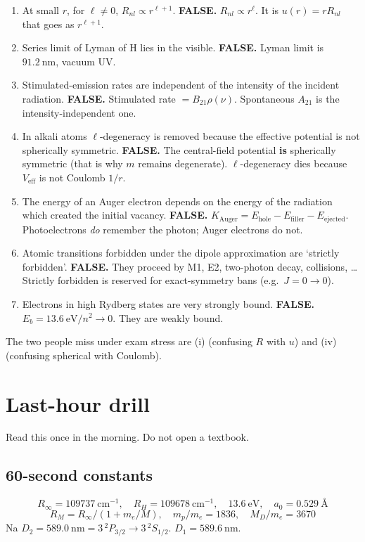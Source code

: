 \documentclass[11pt,a4paper]{article}
\begin{document}
\begin{enumerate}[leftmargin=1.4em]
\item At small \(r\), for \(\ell\neq 0\), \(R_{nl}\propto r^{\ell+1}\).
\textbf{FALSE.} \(R_{nl}\propto r^{\ell}\). It is \(u(r)=r R_{nl}\) that goes as \(r^{\ell+1}\).
\item Series limit of Lyman of H lies in the visible.
\textbf{FALSE.} Lyman limit is \(91.2~\mathrm{nm}\), vacuum UV.
\item Stimulated-emission rates are independent of the intensity of the incident radiation.
\textbf{FALSE.} Stimulated rate \(=B_{21}\rho(\nu)\). Spontaneous \(A_{21}\) is the intensity-independent one.
\item In alkali atoms \(\ell\)-degeneracy is removed because the effective potential is not spherically symmetric.
\textbf{FALSE.} The central-field potential \textbf{is} spherically symmetric (that is why \(m\) remains degenerate). \(\ell\)-degeneracy dies because \(V_{\mathrm{eff}}\) is not Coulomb \(1/r\).
\item The energy of an Auger electron depends on the energy of the radiation which created the initial vacancy.
\textbf{FALSE.} \(K_{\mathrm{Auger}}=E_{\mathrm{hole}}-E_{\mathrm{filler}}-E_{\mathrm{ejected}}\). Photoelectrons \emph{do} remember the photon; Auger electrons do not.
\item Atomic transitions forbidden under the dipole approximation are `strictly forbidden'.
\textbf{FALSE.} They proceed by M1, E2, two-photon decay, collisions, \ldots Strictly forbidden is reserved for exact-symmetry bans (e.g.\ \(J=0\to 0\)).
\item Electrons in high Rydberg states are very strongly bound.
\textbf{FALSE.} \(E_b=13.6~\mathrm{eV}/n^2\to 0\). They are weakly bound.
\end{enumerate}
The two people miss under exam stress are (i) (confusing \(R\) with \(u\)) and (iv) (confusing spherical with Coulomb).

\newpage
\section{Last-hour drill}

Read this once in the morning. Do not open a textbook.

\subsection*{60-second constants}
\[
R_\infty=109737~\mathrm{cm}^{-1},\quad R_H=109678~\mathrm{cm}^{-1},\quad 13.6~\mathrm{eV},\quad a_0=0.529~\text{\AA}
\]
\[
R_M=R_\infty/(1+m_e/M),\quad m_p/m_e=1836,\quad M_D/m_e=3670
\]
Na \(D_2=589.0~\mathrm{nm}=3\,{}^2P_{3/2}\to 3\,{}^2S_{1/2}\). \(D_1=589.6~\mathrm{nm}\).
\end{document}
